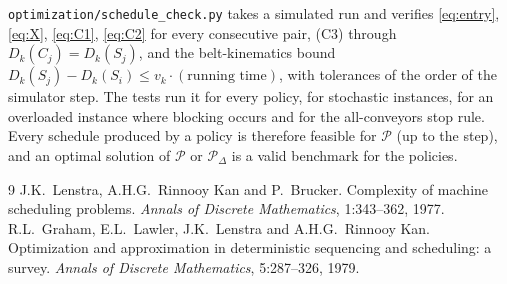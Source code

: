 \documentclass[11pt,a4paper]{article}
\theoremstyle{definition}
\theoremstyle{remark}
\newcommand{\Pb}{\mathcal{P}}
\begin{document}
\texttt{optimization/schedule\_check.py} takes a simulated run and verifies
\eqref{eq:entry}, \eqref{eq:X}, \eqref{eq:C1}, \eqref{eq:C2} for every consecutive pair,
(C3) through $D_k(C_j)=D_k(S_j)$, and the belt-kinematics bound
$D_k(S_j)-D_k(S_i)\le v_k\cdot(\text{running time})$, with tolerances of the order of the
simulator step. The tests run it for every policy, for stochastic instances, for an
overloaded instance where blocking occurs and for the all-conveyors stop rule. Every
schedule produced by a policy is therefore feasible for $\Pb$ (up to the step), and an
optimal solution of $\Pb$ or $\Pb_\Delta$ is a valid benchmark for the policies.

\begin{thebibliography}{9}
 J.K.~Lenstra, A.H.G.~Rinnooy Kan and P.~Brucker.
Complexity of machine scheduling problems.
\emph{Annals of Discrete Mathematics}, 1:343--362, 1977.
 R.L.~Graham, E.L.~Lawler, J.K.~Lenstra and A.H.G.~Rinnooy Kan.
Optimization and approximation in deterministic sequencing and scheduling: a survey.
\emph{Annals of Discrete Mathematics}, 5:287--326, 1979.
\end{thebibliography}
\end{document}

